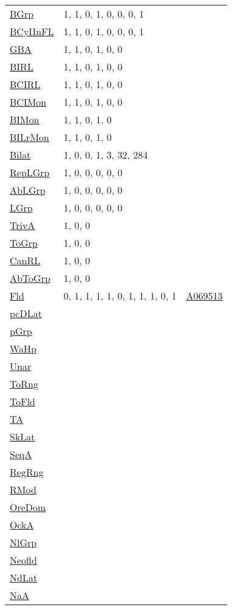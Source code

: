 {\begin{tabular}{|l|l|l|}
\hyperlink{BGrp}{BGrp}& 1, 1, 0, 1, 0, 0, 0, 1&\\
\hyperlink{BCyIInFL}{BCyIInFL}& 1, 1, 0, 1, 0, 0, 0, 1&\\
\hyperlink{GBA}{GBA}& 1, 1, 0, 1, 0, 0&\\
\hyperlink{BIRL}{BIRL}& 1, 1, 0, 1, 0, 0&\\
\hyperlink{BCIRL}{BCIRL}& 1, 1, 0, 1, 0, 0&\\
\hyperlink{BCIMon}{BCIMon}& 1, 1, 0, 1, 0, 0&\\
\hyperlink{BIMon}{BIMon}& 1, 1, 0, 1, 0&\\
\hyperlink{BILrMon}{BILrMon}& 1, 1, 0, 1, 0&\\
\hyperlink{Bilat}{Bilat}& 1, 0, 0, 1, 3, 32, 284&\\
\hyperlink{RepLGrp}{RepLGrp}& 1, 0, 0, 0, 0, 0&\\
\hyperlink{AbLGrp}{AbLGrp}& 1, 0, 0, 0, 0, 0&\\
\hyperlink{LGrp}{LGrp}& 1, 0, 0, 0, 0, 0&\\
\hyperlink{TrivA}{TrivA}& 1, 0, 0&\\
\hyperlink{ToGrp}{ToGrp}& 1, 0, 0&\\
\hyperlink{CanRL}{CanRL}& 1, 0, 0&\\
\hyperlink{AbToGrp}{AbToGrp}& 1, 0, 0&\\
\hyperlink{Fld}{Fld}& 0, 1, 1, 1, 1, 0, 1, 1, 1, 0, 1 &\href{https://oeis.org/A069513}{A069513}\\
\hyperlink{pcDLat}{pcDLat}& &\\
\hyperlink{pGrp}{pGrp}& &\\
\hyperlink{WaHp}{WaHp}& &\\
\hyperlink{Unar}{Unar}& &\\
\hyperlink{ToRng}{ToRng}& &\\
\hyperlink{ToFld}{ToFld}& &\\
\hyperlink{TA}{TA}& &\\
\hyperlink{SkLat}{SkLat}& &\\
\hyperlink{SeqA}{SeqA}& &\\
\hyperlink{RegRng}{RegRng}& &\\
\hyperlink{RMod}{RMod}& &\\
\hyperlink{OreDom}{OreDom}& &\\
\hyperlink{OckA}{OckA}& &\\
\hyperlink{NlGrp}{NlGrp}& &\\
\hyperlink{Neofld}{Neofld}& &\\
\hyperlink{NdLat}{NdLat}& &\\
\hyperlink{NaA}{NaA}& &\\
\end{tabular}

}

